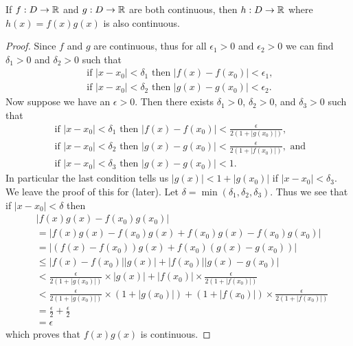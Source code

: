\begin{proposition}\label{prop-product-of-continuous-functions-is-continuous}
    If $f: D \to \mathbb{R}$ and $g: D \to \mathbb{R}$ are both continuous, then $h: D \to \mathbb{R}$ where $h(x) = f(x)g(x)$ is also continuous.
\end{proposition}
\begin{proof}
    Since $f$ and $g$ are continuous, thus for all $\epsilon_1 > 0$ and $\epsilon_2 > 0$ we can find $\delta_1 > 0$ and $\delta_2 > 0$ such that
    \begin{gather*}
        \text{ if } |x - x_0| < \delta_1 \text{ then } |f(x) - f(x_0)| < \epsilon_1,\\
        \text{ if } |x - x_0| < \delta_2 \text{ then } |g(x) - g(x_0)| < \epsilon_2.
    \end{gather*}
    Now suppose we have an $\epsilon > 0$. Then there exists $\delta_1 > 0$, $\delta_2 > 0$, and $\delta_3 > 0$ such that
    \begin{gather*}
        \text{ if } |x - x_0| < \delta_1 \text{ then } |f(x) - f(x_0)| < \frac{\epsilon}{2(1+|g(x_0)|)},\\
        \text{ if } |x - x_0| < \delta_2 \text{ then } |g(x) - g(x_0)| < \frac{\epsilon}{2(1+|f(x_0)|)}, \text{ and}\\
        \text{ if } |x - x_0| < \delta_3 \text{ then } |g(x) - g(x_0)| < 1.
    \end{gather*}
    In particular the last condition tells us $|g(x)| < 1 + |g(x_0)|$ if $|x - x_0| < \delta_3$. We leave the proof of this for  (later). Let $\delta = \min(\delta_1, \delta_2, \delta_3)$. Thus we see that if $|x - x_0| < \delta$ then
    \begin{align*}
        &|f(x)g(x) - f(x_0)g(x_0)|\\
        &= |f(x)g(x) - f(x_0)g(x) + f(x_0)g(x) - f(x_0)g(x_0)|\\
        &= |(f(x) - f(x_0))g(x) + f(x_0)(g(x)-g(x_0))|\\
        &\leq |f(x)-f(x_0)||g(x)| + |f(x_0)||g(x) - g(x_0)|\\
        &< \frac{\epsilon}{2(1+|g(x_0)|)}\times|g(x)| + |f(x_0)|\times\frac{\epsilon}{2(1+|f(x_0)|)}\\
        &< \frac{\epsilon}{2(1+|g(x_0)|)}\times(1 + |g(x_0)|) + (1 + |f(x_0)|)\times\frac{\epsilon}{2(1+|f(x_0)|)}\\
        &= \frac\epsilon2 + \frac\epsilon2\\
        &= \epsilon
    \end{align*}
    which proves that $f(x)g(x)$ is continuous.
\end{proof}

